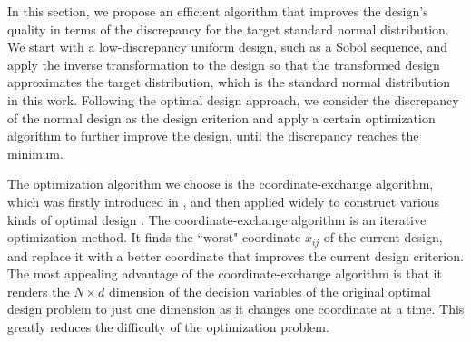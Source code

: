 \documentclass[graybox]{svmult}
\begin{document}
In this section, we propose an efficient algorithm that improves the design's quality in terms of the discrepancy for the target standard normal distribution. 
We start with a low-discrepancy uniform design, such as a Sobol sequence, and apply the inverse transformation to the design so that the transformed design approximates the target distribution, which is the standard normal distribution in this work. 
Following the optimal design approach, we consider the discrepancy of the normal design as the design criterion and apply a certain optimization algorithm to further improve the design, until the discrepancy reaches the minimum.

The optimization algorithm we choose is the coordinate-exchange algorithm, which was firstly introduced in \cite{meyer1995coordinate}, and then applied widely to construct various kinds of optimal design \cite{sambo2014coordinate,overstall2017bayesian,kang2018stochastic}. 
The coordinate-exchange algorithm is an iterative optimization method.
It finds the ``worst" coordinate $x_{ij}$ of the current design, and replace it with a better coordinate that improves the current design criterion. 
The most appealing advantage of the coordinate-exchange algorithm is that it renders the $N\times d$ dimension of the decision variables of the original optimal design problem to just one dimension as it changes one coordinate at a time. 
This greatly reduces the difficulty of the optimization problem. 
\end{document}

